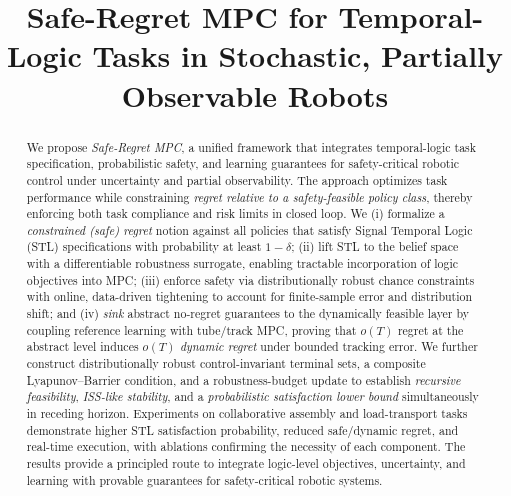 \documentclass[journal]{IEEEtran}
\theoremstyle{definition}
\begin{document}
\title{Safe-Regret MPC for Temporal-Logic Tasks in Stochastic, Partially Observable Robots}
%
%		
%		
% 

\maketitle
	
\begin{abstract}
We propose \emph{Safe-Regret MPC}, a unified framework that integrates temporal-logic task specification, probabilistic safety, and learning guarantees for safety-critical robotic control under uncertainty and partial observability. The approach optimizes task performance while constraining \emph{regret relative to a safety-feasible policy class}, thereby enforcing both task compliance and risk limits in closed loop. We (i) formalize a \emph{constrained (safe) regret} notion against all policies that satisfy Signal Temporal Logic (STL) specifications with probability at least $1-\delta$; (ii) lift STL to the belief space with a differentiable robustness surrogate, enabling tractable incorporation of logic objectives into MPC; (iii) enforce safety via distributionally robust chance constraints with online, data-driven tightening to account for finite-sample error and distribution shift; and (iv) \emph{sink} abstract no-regret guarantees to the dynamically feasible layer by coupling reference learning with tube/track MPC, proving that $o(T)$ regret at the abstract level induces $o(T)$ \emph{dynamic regret} under bounded tracking error. We further construct distributionally robust control-invariant terminal sets, a composite Lyapunov--Barrier condition, and a robustness-budget update to establish \emph{recursive feasibility}, \emph{ISS-like stability}, and a \emph{probabilistic satisfaction lower bound} simultaneously in receding horizon. Experiments on collaborative assembly and load-transport tasks demonstrate higher STL satisfaction probability, reduced safe/dynamic regret, and real-time execution, with ablations confirming the necessity of each component. The results provide a principled route to integrate logic-level objectives, uncertainty, and learning with provable guarantees for safety-critical robotic systems.
\end{abstract}
\end{document}

